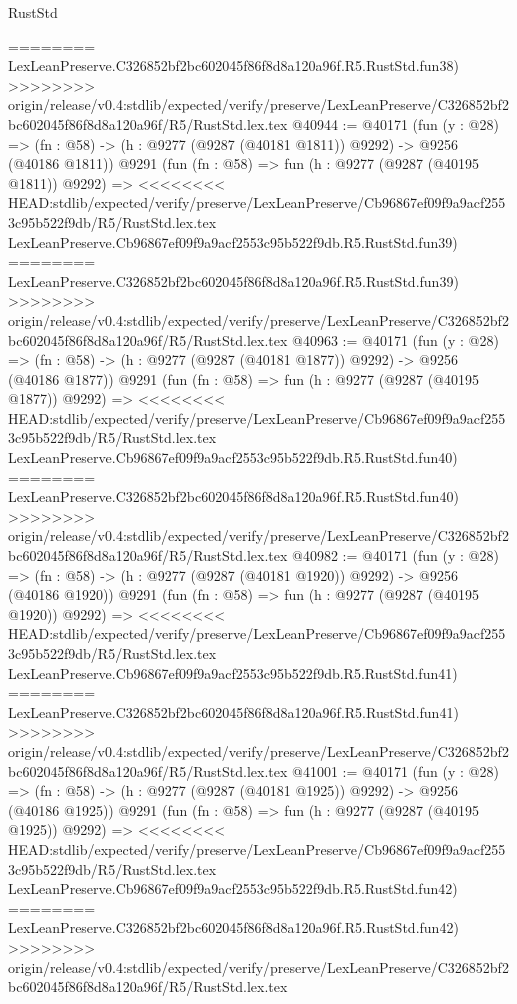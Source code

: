 \begin{lexlean}{RustStd}
\begin{coremodule}
{\begin{coremodule}
{{{{{{{{{{{{{{{{{{{{{{{{{{{{{{{{{{{{{{{{{{{{{{{{{{{{{{{========
    LexLeanPreserve.C326852bf2bc602045f86f8d8a120a96f.R5.RustStd.fun38)
>>>>>>>> origin/release/v0.4:stdlib/expected/verify/preserve/LexLeanPreserve/C326852bf2bc602045f86f8d8a120a96f/R5/RustStd.lex.tex
@40944 := @40171
    (fun (y : @28) =>
    (fn : @58) -> (h : @9277 (@9287 (@40181 @1811)) @9292) -> @9256 (@40186 @1811))
    @9291
    (fun (fn : @58) =>
    fun (h : @9277 (@9287 (@40195 @1811)) @9292) =>
<<<<<<<< HEAD:stdlib/expected/verify/preserve/LexLeanPreserve/Cb96867ef09f9a9acf2553c95b522f9db/R5/RustStd.lex.tex
    LexLeanPreserve.Cb96867ef09f9a9acf2553c95b522f9db.R5.RustStd.fun39)
========
    LexLeanPreserve.C326852bf2bc602045f86f8d8a120a96f.R5.RustStd.fun39)
>>>>>>>> origin/release/v0.4:stdlib/expected/verify/preserve/LexLeanPreserve/C326852bf2bc602045f86f8d8a120a96f/R5/RustStd.lex.tex
@40963 := @40171
    (fun (y : @28) =>
    (fn : @58) -> (h : @9277 (@9287 (@40181 @1877)) @9292) -> @9256 (@40186 @1877))
    @9291
    (fun (fn : @58) =>
    fun (h : @9277 (@9287 (@40195 @1877)) @9292) =>
<<<<<<<< HEAD:stdlib/expected/verify/preserve/LexLeanPreserve/Cb96867ef09f9a9acf2553c95b522f9db/R5/RustStd.lex.tex
    LexLeanPreserve.Cb96867ef09f9a9acf2553c95b522f9db.R5.RustStd.fun40)
========
    LexLeanPreserve.C326852bf2bc602045f86f8d8a120a96f.R5.RustStd.fun40)
>>>>>>>> origin/release/v0.4:stdlib/expected/verify/preserve/LexLeanPreserve/C326852bf2bc602045f86f8d8a120a96f/R5/RustStd.lex.tex
@40982 := @40171
    (fun (y : @28) =>
    (fn : @58) -> (h : @9277 (@9287 (@40181 @1920)) @9292) -> @9256 (@40186 @1920))
    @9291
    (fun (fn : @58) =>
    fun (h : @9277 (@9287 (@40195 @1920)) @9292) =>
<<<<<<<< HEAD:stdlib/expected/verify/preserve/LexLeanPreserve/Cb96867ef09f9a9acf2553c95b522f9db/R5/RustStd.lex.tex
    LexLeanPreserve.Cb96867ef09f9a9acf2553c95b522f9db.R5.RustStd.fun41)
========
    LexLeanPreserve.C326852bf2bc602045f86f8d8a120a96f.R5.RustStd.fun41)
>>>>>>>> origin/release/v0.4:stdlib/expected/verify/preserve/LexLeanPreserve/C326852bf2bc602045f86f8d8a120a96f/R5/RustStd.lex.tex
@41001 := @40171
    (fun (y : @28) =>
    (fn : @58) -> (h : @9277 (@9287 (@40181 @1925)) @9292) -> @9256 (@40186 @1925))
    @9291
    (fun (fn : @58) =>
    fun (h : @9277 (@9287 (@40195 @1925)) @9292) =>
<<<<<<<< HEAD:stdlib/expected/verify/preserve/LexLeanPreserve/Cb96867ef09f9a9acf2553c95b522f9db/R5/RustStd.lex.tex
    LexLeanPreserve.Cb96867ef09f9a9acf2553c95b522f9db.R5.RustStd.fun42)
========
    LexLeanPreserve.C326852bf2bc602045f86f8d8a120a96f.R5.RustStd.fun42)
>>>>>>>> origin/release/v0.4:stdlib/expected/verify/preserve/LexLeanPreserve/C326852bf2bc602045f86f8d8a120a96f/R5/RustStd.lex.tex
}}}}}}}}}}}}}}}}}}}}}}}}}}}}}}}}}}}}}}}}}}}}}}}}}}}}}}}
\end{coremodule}}
\end{coremodule}
\end{lexlean}
